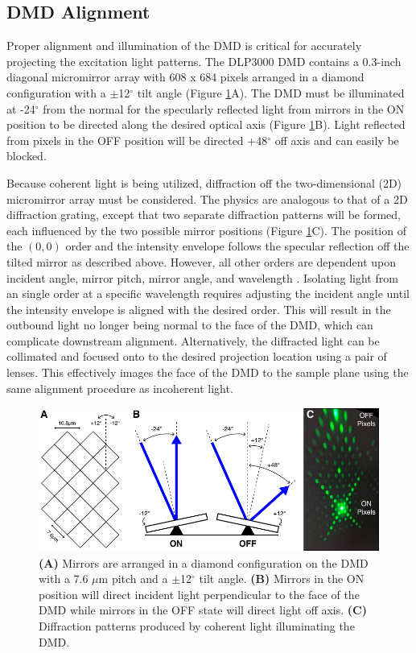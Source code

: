 \subsection{DMD Alignment} \label{ssec:dmd_registration}

Proper alignment and illumination of the DMD is critical for accurately projecting the excitation light patterns. The DLP3000 DMD contains a 0.3-inch diagonal micromirror array with 608 x 684 pixels arranged in a diamond configuration with a $\pm$12$^\circ$ tilt angle (Figure \ref{fig:dmdmirror}A). The DMD must be illuminated at -24$^\circ$ from the normal for the specularly reflected light from mirrors in the ON position to be directed along the desired optical axis (Figure \ref{fig:dmdmirror}B). Light reflected from pixels in the OFF position will be directed +48$^\circ$ off axis and can easily be blocked.

Because coherent light is being utilized, diffraction off the two-dimensional (2D) micromirror array must be considered. The physics are analogous to that of a 2D diffraction grating, except that two separate diffraction patterns will be formed, each influenced by the two possible mirror positions (Figure \ref{fig:dmdmirror}C). The position of the $(0,0)$ order and the intensity envelope follows the specular reflection off the tilted mirror as described above. However, all other orders are dependent upon incident angle, mirror pitch, mirror angle, and wavelength \cite{TexasInstruments:2009tr}. Isolating light from an single order at a specific wavelength requires adjusting the incident angle until the intensity envelope is aligned with the desired order. This will result in the outbound light no longer being normal to the face of the DMD, which can complicate downstream alignment. Alternatively, the diffracted light can be collimated and focused onto to the desired projection location using a pair of lenses. This effectively images the face of the DMD to the sample plane using the same alignment procedure as incoherent light.

\begin{figure}
    \includegraphics{figures/chapter_2/dmdmirror.pdf}
    \caption{
        \label{fig:dmdmirror}
        \textbf{(A)} Mirrors are arranged in a diamond configuration on the DMD with a 7.6 $\mu$m pitch and a $\pm$12$^\circ$ tilt angle. \textbf{(B)} Mirrors in the ON position will direct incident light perpendicular to the face of the DMD while mirrors in the OFF state will direct light off axis. \textbf{(C)} Diffraction patterns produced by coherent light illuminating the DMD.
    }
\end{figure}

